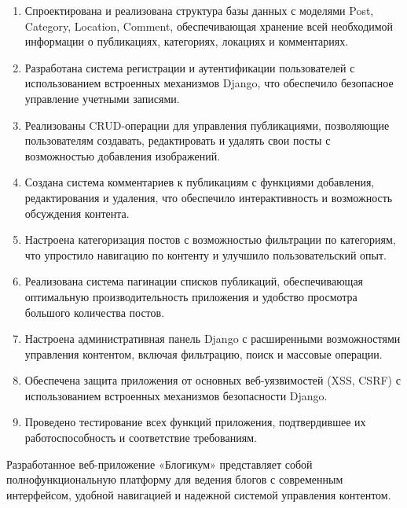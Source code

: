 \documentclass[pract,och,bachelor]{SCWorks}
\begin{document}
\begin{enumerate}
    \item Спроектирована и реализована структура базы данных с моделями Post, Category, Location, Comment, обеспечивающая хранение всей необходимой информации о публикациях, категориях, локациях и комментариях.
    
    \item Разработана система регистрации и аутентификации пользователей с использованием встроенных механизмов Django, что обеспечило безопасное управление учетными записями.
    
    \item Реализованы CRUD-операции для управления публикациями, позволяющие пользователям создавать, редактировать и удалять свои посты с возможностью добавления изображений.
    
    \item Создана система комментариев к публикациям с функциями добавления, редактирования и удаления, что обеспечило интерактивность и возможность обсуждения контента.
    
    \item Настроена категоризация постов с возможностью фильтрации по категориям, что упростило навигацию по контенту и улучшило пользовательский опыт.
    
    \item Реализована система пагинации списков публикаций, обеспечивающая оптимальную производительность приложения и удобство просмотра большого количества постов.
    
    \item Настроена административная панель Django с расширенными возможностями управления контентом, включая фильтрацию, поиск и массовые операции.
    
    \item Обеспечена защита приложения от основных веб-уязвимостей (XSS, CSRF) с использованием встроенных механизмов безопасности Django.
    
    \item Проведено тестирование всех функций приложения, подтвердившее их работоспособность и соответствие требованиям.
\end{enumerate}

Разработанное веб-приложение «Блогикум» представляет собой полнофункциональную платформу для ведения блогов с современным интерфейсом, удобной навигацией и надежной системой управления контентом.
\end{document}
